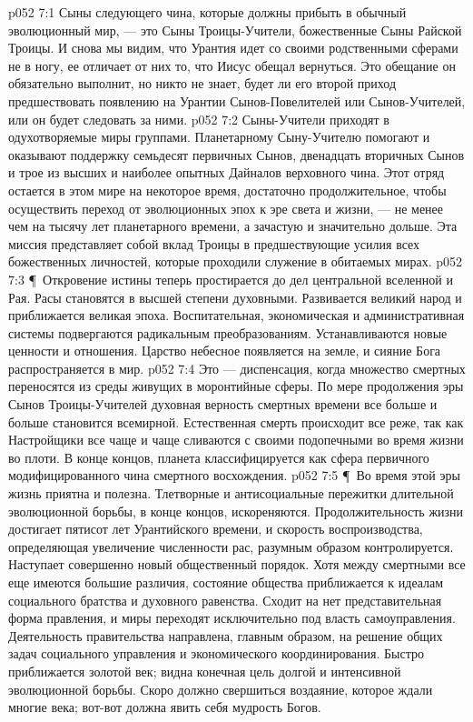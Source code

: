 \vs p052 7:1 Сыны следующего чина, которые должны прибыть в обычный эволюционный мир, --- это Сыны Троицы\hyp{}Учители, божественные Сыны Райской Троицы. И снова мы видим, что Урантия идет со своими родственными сферами не в ногу, ее отличает от них то, что Иисус обещал вернуться. Это обещание он обязательно выполнит, но никто не знает, будет ли его второй приход предшествовать появлению на Урантии Сынов\hyp{}Повелителей или Сынов\hyp{}Учителей, или он будет следовать за ними.
\vs p052 7:2 Сыны\hyp{}Учители приходят в одухотворяемые миры группами. Планетарному Сыну\hyp{}Учителю помогают и оказывают поддержку семьдесят первичных Сынов, двенадцать вторичных Сынов и трое из высших и наиболее опытных Дайналов верховного чина. Этот отряд остается в этом мире на некоторое время, достаточно продолжительное, чтобы осуществить переход от эволюционных эпох к эре света и жизни, --- не менее чем на тысячу лет планетарного времени, а зачастую и значительно дольше. Эта миссия представляет собой вклад Троицы в предшествующие усилия всех божественных личностей, которые проходили служение в обитаемых мирах.
\vs p052 7:3 \P\ Откровение истины теперь простирается до дел центральной вселенной и Рая. Расы становятся в высшей степени духовными. Развивается великий народ и приближается великая эпоха. Воспитательная, экономическая и административная системы подвергаются радикальным преобразованиям. Устанавливаются новые ценности и отношения. Царство небесное появляется на земле, и сияние Бога распространяется в мир.
\vs p052 7:4 Это --- диспенсация, когда множество смертных переносятся из среды живущих в моронтийные сферы. По мере продолжения эры Сынов Троицы\hyp{}Учителей духовная верность смертных времени все больше и больше становится всемирной. Естественная смерть происходит все реже, так как Настройщики все чаще и чаще сливаются с своими подопечными во время жизни во плоти. В конце концов, планета классифицируется как сфера первичного модифицированного чина смертного восхождения.
\vs p052 7:5 \P\ Во время этой эры жизнь приятна и полезна. Тлетворные и антисоциальные пережитки длительной эволюционной борьбы, в конце концов, искореняются. Продолжительность жизни достигает пятисот лет Урантийского времени, и скорость воспроизводства, определяющая увеличение численности рас, разумным образом контролируется. Наступает совершенно новый общественный порядок. Хотя между смертными все еще имеются большие различия, состояние общества приближается к идеалам социального братства и духовного равенства. Сходит на нет представительная форма правления, и миры переходят исключительно под власть самоуправления. Деятельность правительства направлена, главным образом, на решение общих задач социального управления и экономического координирования. Быстро приближается золотой век; видна конечная цель долгой и интенсивной эволюционной борьбы. Скоро должно свершиться воздаяние, которое ждали многие века; вот\hyp{}вот должна явить себя мудрость Богов.
